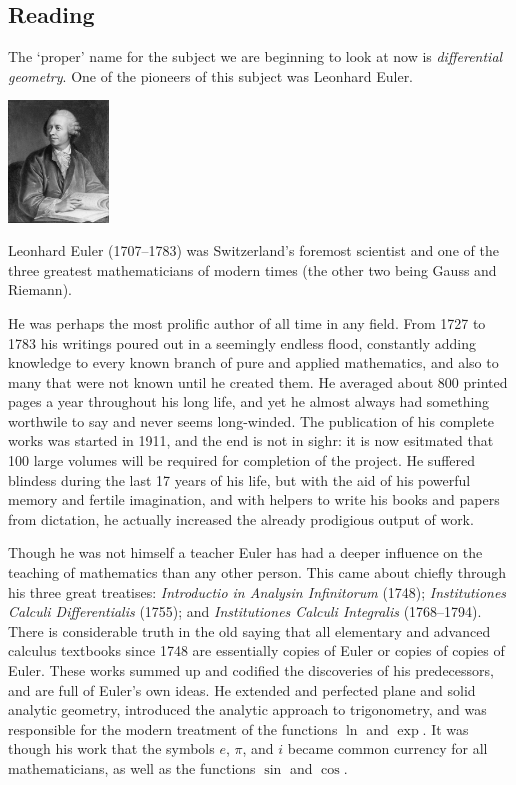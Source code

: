 


\subsection*{Reading}
The `proper' name for the subject we are beginning to look at now is \emph{differential geometry}. One of the pioneers of this
subject was Leonhard Euler.

\begin{center}
  \includegraphics[width=0.2\textwidth]{euler}
\end{center}

Leonhard Euler (1707--1783) was Switzerland's foremost scientist and one of the three greatest mathematicians of modern times (the other two being
Gauss and Riemann).

He was perhaps the most prolific author of all time in any field. From 1727 to 1783 his writings poured out in a seemingly endless flood, constantly
adding knowledge to every known branch of pure and applied mathematics, and also to many that were not known until he created them. He averaged about
800 printed pages a year throughout his long life, and yet he almost always had something worthwile to say and never seems long-winded. The publication
of his complete works was started in 1911, and the end is not in sighr: it is now esitmated that 100 large volumes will be required for completion
of the project. He suffered blindess during the last 17 years of his life, but with the aid of his powerful memory and fertile imagination, and with
helpers to write his books and papers from dictation, he actually increased the already prodigious output of work.

Though he was not himself a teacher Euler has had a deeper influence on the teaching of mathematics than any other person. This came about chiefly
through his three great treatises: \emph{Introductio in Analysin Infinitorum} (1748); \emph{Institutiones Calculi Differentialis} (1755);
and \emph{Institutiones Calculi Integralis} (1768--1794). There is considerable truth in the old saying that all elementary and advanced calculus
textbooks since 1748 are essentially copies of Euler or copies of copies of Euler. These works summed up and codified the discoveries of his
predecessors, and are full of Euler's own ideas. He extended and perfected plane and solid analytic geometry, introduced the analytic approach
to trigonometry, and was responsible for the modern treatment of the functions $ \ln $ and $ \exp $. It was though his work that the symbols $ e $,
$ \pi $, and $ i $ became common currency for all mathematicians, as well as the functions $ \sin $ and $ \cos $.

